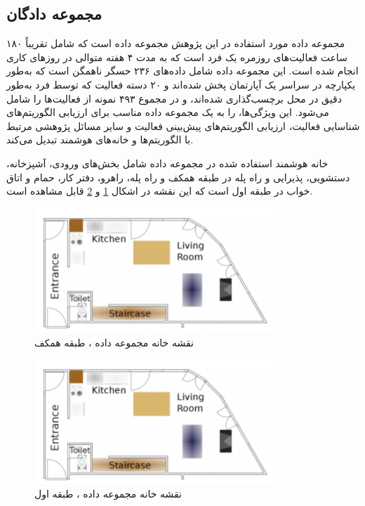 \subsection{مجموعه دادگان}

مجموعه داده مورد استفاده در این پژوهش مجموعه داده  \cite{xyz6} است که شامل تقریباً ۱۸۰ ساعت فعالیت‌های روزمره یک فرد است که به مدت ۴ هفته متوالی در روزهای کاری انجام شده است. این مجموعه داده شامل داده‌های ۲۳۶ حسگر ناهمگن است که به‌طور یکپارچه در سراسر یک آپارتمان پخش شده‌اند و ۲۰ دسته فعالیت که توسط فرد به‌طور دقیق در محل برچسب‌گذاری شده‌اند، و در مجموع ۴۹۳ نمونه از فعالیت‌ها را شامل می‌شود. این ویژگی‌ها،  را به یک مجموعه داده مناسب برای ارزیابی الگوریتم‌های شناسایی فعالیت، ارزیابی الگوریتم‌های پیش‌بینی فعالیت و سایر مسائل پژوهشی مرتبط با الگوریتم‌ها و خانه‌های هوشمند تبدیل می‌کند.

خانه هوشمند استفاده شده در مجموعه داده  شامل بخش‌های ورودی، آشپزخانه، دستشویی، پذیرایی و راه پله در طبقه همکف و راه پله، راهرو، دفتر کار، حمام و اتاق خواب در طبقه اول است که این نقشه در اشکال \ref{fig:fO4H1} و  \ref{fig:fO4H2} قابل مشاهده است.

\begin{figure}[H]
\centerline{\includegraphics[width=0.8\textwidth]{figs/fO4H1.png}}
\caption{نقشه خانه مجموعه داده ، طبقه همکف}
\label{fig:fO4H1}
\end{figure}

\begin{figure}[H]
\centerline{\includegraphics[width=0.8\textwidth]{figs/fO4H1.png}}
\caption{نقشه خانه مجموعه داده ، طبقه اول}
\label{fig:fO4H2}
\end{figure}

